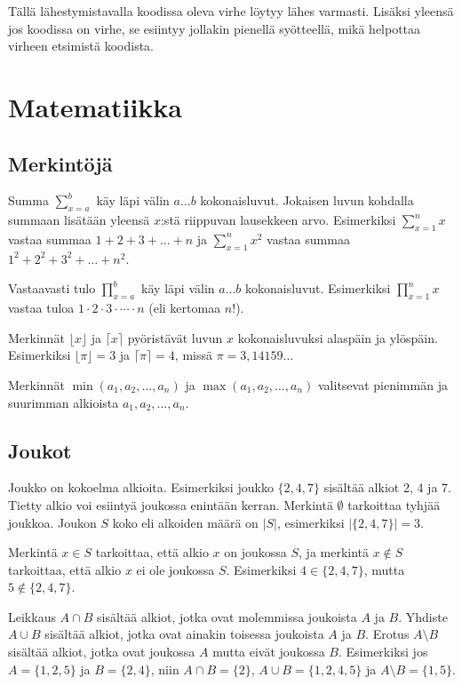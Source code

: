 Tällä lähestymistavalla
koodissa oleva virhe löytyy
lähes varmasti.
Lisäksi yleensä jos koodissa on virhe,
se esiintyy jollakin pienellä syötteellä,
mikä helpottaa virheen etsimistä koodista.

\section{Matematiikka}

\subsection{Merkintöjä}

Summa $\sum_{x=a}^b$ käy läpi välin $a \ldots b$ kokonaisluvut.
Jokaisen luvun kohdalla summaan lisätään
yleensä $x$:stä riippuvan lausekkeen arvo.
Esimerkiksi $\sum_{x=1}^n x$
vastaa summaa $1+2+3+\ldots+n$
ja $\sum_{x=1}^n x^2$
vastaa summaa $1^2+2^2+3^2+\ldots+n^2$.

Vastaavasti tulo $\prod_{x=a}^b$
käy läpi välin $a \ldots b$ kokonaisluvut.
Esimerkiksi $\prod_{x=1}^n x$ vastaa tuloa
$1 \cdot 2 \cdot 3 \cdot \cdots \cdot n$ (eli kertomaa $n!$).

Merkinnät $\lfloor x \rfloor$ ja $\lceil x \rceil$
pyöristävät luvun $x$ kokonaisluvuksi alaspäin ja ylöspäin.
Esimerkiksi $\lfloor \pi \rfloor = 3$ ja $\lceil \pi \rceil = 4$,
missä $\pi = 3{,}14159\ldots$

Merkinnät $\min(a_1,a_2,\ldots,a_n)$ ja
$\max(a_1,a_2,\ldots,a_n)$ valitsevat
pienimmän ja suurimman alkioista
$a_1,a_2,\ldots,a_n$.

\subsection{Joukot}


Joukko on kokoelma alkioita.
Esimerkiksi joukko $\{2,4,7\}$
sisältää alkiot 2, 4 ja 7.
Tietty alkio voi esiintyä joukossa enintään kerran.
Merkintä $\emptyset$ tarkoittaa tyhjää joukkoa.
Joukon $S$ koko eli alkoiden määrä on $|S|$,
esimerkiksi $|\{2,4,7\}|=3$.

Merkintä $x \in S$ tarkoittaa,
että alkio $x$ on joukossa $S$,
ja merkintä $x \notin S$ tarkoittaa,
että alkio $x$ ei ole joukossa $S$.
Esimerkiksi $4 \in \{2,4,7\}$,
mutta $5 \notin \{2,4,7\}$.

Leikkaus $A \cap B$ sisältää alkiot,
jotka ovat molemmissa joukoista $A$ ja $B$.
Yhdiste $A \cup B$ sisältää alkiot,
jotka ovat ainakin toisessa joukoista $A$ ja $B$.
Erotus $A \setminus B$ sisältää alkiot,
jotka ovat joukossa $A$ mutta eivät joukossa $B$.
Esimerkiksi jos $A=\{1,2,5\}$ ja $B=\{2,4\}$,
niin $A \cap B = \{2\}$, $A \cup B = \{1,2,4,5\}$
ja $A \setminus B = \{1,5\}$.

